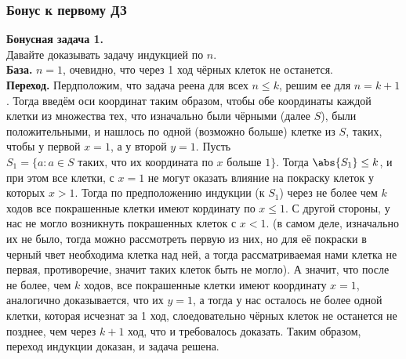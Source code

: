 \subsubsection{Бонус к первому ДЗ}


\textbf{Бонусная задача 1.}\\
Давайте доказывать задачу индукцией по $n$.\\
\textbf{База.} $n=1$, очевидно, что через 1 ход чёрных клеток не останется.\\
\textbf{Переход.} Пердположим, что задача реена для всех $n \leq k$, решим ее для $n=k+1$. Тогда введём оси координат таким образом, чтобы обе координаты каждой клетки из множества тех, что изначально были чёрными (далее $S$), были положительными, и нашлось по одной (возможно больше) клетке из $S$, таких, чтобы у первой $x=1$, а у второй $y=1$. Пусть $S_1 = \{a: a \in S \text{ таких, что их координата по $x$ больше 1}\}$. Тогда $\abs{S_1} \leq k$, и при этом все клетки, с $x = 1$ не могут оказать влияние на покраску клеток у которых $x > 1$. Тогда по предположению индукции (к $S_1$) через не более чем $k$ ходов все покрашенные клетки имеют кординату по $x \leq 1$. С другой стороны, у нас не могло возникнуть покрашенных клеток с $x < 1$. (в самом деле, изначально их не было, тогда можно рассмотреть первую из них, но для её покраски в черный чвет необходима клетка над ней, а тогда рассматриваемая нами клетка не первая, противоречие, значит таких клеток быть не могло). А значит, что после не более, чем $k$ ходов, все покрашенные клетки имеют координату $x = 1$, аналогично доказывается, что их $y = 1$, а тогда у нас осталось не более одной клетки, которая исчезнат за 1 ход, слоедовательно чёрных клеток не останется не позднее, чем через $k+1$ ход, что и требовалось доказать. Таким образом, переход индукции доказан, и задача решена.

